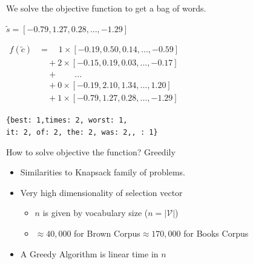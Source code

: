 \documentclass[]{beamer}
\renewcommand{\c}{\tilde{c}}
\newcommand{\s}{\tilde{s}}
\newcommand{\x}{\tilde{x}}
\newcommand{\V}{\mathcal{V}}
\renewcommand{\B}{\mathcal{B}}
\begin{document}
\begin{frame}{We solve the objective function to get a bag of words.}
	\vectorselectionproblemdefn
	\vfill
	\begin{description}
		\item<2->[Input Vector]  $\s=[−0.79, 1.27, 0.28, ..., −1.29]$
		\vfill
		\item<3->[Vector Selection] $\displaystyle
			\begin{aligned}%
			f(\c)&=\quad1\times[−0.19, 0.50, 0.14, ..., −0.59]\\
			&\quad+2\times[-0.15, 0.19, 0.03, ..., -0.17]\\
			&\quad+\qquad...\\
			&\quad+0\times[−0.19, 2.10, 1.34, ..., 1.20]\\
			&\quad+1\times[−0.79, 1.27, 0.28, ..., −1.29]
		\end{aligned}
		$
		\vfill
		\item<4->[BOW] \texttt{\{best: 1,times: 2, worst: 1, \\it: 2, of: 2, the: 2, was: 2,, : 1\}}
	\end{description}
\end{frame}

\begin{frame}{How to solve objective the function? Greedily}
	\vectorselectionproblemdefn
		\vfill
	\begin{itemize}
		\item<1-> Similarities to Knapsack family of problems.
		\item<2-> Very high dimensionality of selection vector\begin{itemize}
			\item $n$ is given by vocabulary size ($n=|\V|$)
			\item $\approx40,000$ for Brown Corpus\hfill $\approx170,000$ for Books Corpus\hspace{1em}
			\end{itemize}
		\item<3-> A Greedy Algorithm is linear time in $n$ 
	\end{itemize}
	\vfill
\end{frame}

\newcommand{\vectorselectionproblemdefnalt}{Find the bag of vectors $\B$ (a multi-subset of $\V$), such that $\displaystyle \Sigma(\B)=\sum_{\x_a\in\B}\x_a$ we have  $\min d(\s,\Sigma(\B))$}
\end{document}
